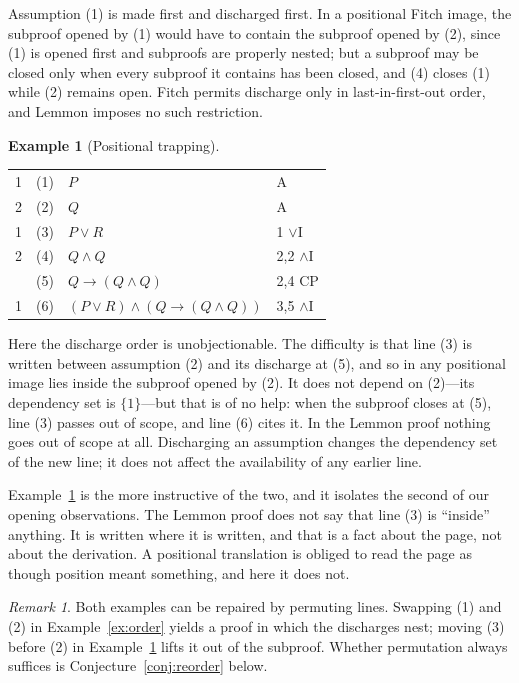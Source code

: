 \documentclass[11pt]{article}
\makeatletter
\theoremstyle{plain}
\theoremstyle{definition}
\newtheorem{example}[theorem]{Example}
\theoremstyle{remark}
\newtheorem{remark}[theorem]{Remark}
\newcommand{\dep}[1]{\textup{#1}}
\newenvironment{lemmonproof}
  {\begin{center}\begin{tabular}{@{}r@{\hspace{1.5em}}r@{\hspace{0.6em}}l@{\hspace{2.5em}}l@{}}}
  {\end{tabular}\end{center}}
\makeatother
\begin{document}
\noindent Assumption (1) is made first and discharged first. In a positional
Fitch image, the subproof opened by (1) would have to contain the subproof
opened by (2), since (1) is opened first and subproofs are properly nested;
but a subproof may be closed only when every subproof it contains has been
closed, and (4) closes (1) while (2) remains open. Fitch permits discharge
only in last-in-first-out order, and Lemmon imposes no such restriction.

\begin{example}[Positional trapping]\label{ex:trap}
\begin{lemmonproof}
\dep{1} & (1) & $P$                                     & A \\
\dep{2} & (2) & $Q$                                     & A \\
\dep{1} & (3) & $P \vee R$                              & 1 $\vee$I \\
\dep{2} & (4) & $Q \wedge Q$                            & 2,2 $\wedge$I \\
        & (5) & $Q \to (Q \wedge Q)$                    & 2,4 CP \\
\dep{1} & (6) & $(P \vee R) \wedge (Q \to (Q \wedge Q))$ & 3,5 $\wedge$I \\
\end{lemmonproof}
\end{example}

\noindent Here the discharge order is unobjectionable. The difficulty is that
line (3) is written between assumption (2) and its discharge at (5), and so in
any positional image lies inside the subproof opened by (2). It does not
depend on (2)---its dependency set is $\{1\}$---but that is of no help: when
the subproof closes at (5), line (3) passes out of scope, and line (6) cites
it. In the Lemmon proof nothing goes out of scope at all. Discharging an
assumption changes the dependency set of the new line; it does not affect the
availability of any earlier line.

Example~\ref{ex:trap} is the more instructive of the two, and it isolates the
second of our opening observations. The Lemmon proof does not say that line
(3) is ``inside'' anything. It is written where it is written, and that is a
fact about the page, not about the derivation. A positional translation is
obliged to read the page as though position meant something, and here it does
not.

\begin{remark}
Both examples can be repaired by permuting lines. Swapping (1) and (2) in
Example~\ref{ex:order} yields a proof in which the discharges nest; moving (3)
before (2) in Example~\ref{ex:trap} lifts it out of the subproof. Whether
permutation always suffices is Conjecture~\ref{conj:reorder} below.
\end{remark}
\end{document}
